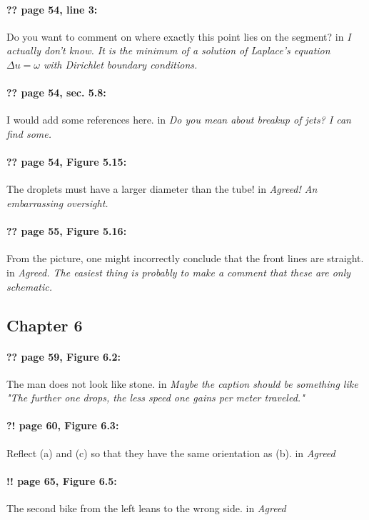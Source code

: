 \documentclass[twoside]{article}
\begin{document}
\paragraph{?? page 54, line 3:} Do you want to comment on where exactly this point lies on the segment?
 in {\it  I actually don't know. It is the minimum of a solution of Laplace's equation $ \Delta u = \omega $ with Dirichlet boundary conditions.} 

\paragraph{?? page 54, sec. 5.8:} I would add some references here.
 in {\it  Do you mean about breakup of jets? I can find some. } 

\paragraph{?? page 54, Figure 5.15:} The droplets must have a larger diameter than the tube!
 in {\it  Agreed! An embarrassing oversight.} 

\paragraph{?? page 55, Figure 5.16:} From the picture, one might incorrectly conclude that the front lines are straight.
 in {\it  Agreed. The easiest thing is probably to make a comment that these are only schematic. } 

\subsection*{Chapter 6}

\paragraph{?? page 59, Figure 6.2:} The man does not look like stone.
 in {\it  Maybe the caption should be something like "The further one drops, the less speed one gains per meter traveled."} 

\paragraph{?! page 60, Figure 6.3:} Reflect (a) and (c) so that they have the same orientation as (b).
 in {\it  Agreed} 

\paragraph{!! page 65, Figure 6.5:} The second bike from the left leans to the wrong side.
 in {\it  Agreed} 
\end{document}
